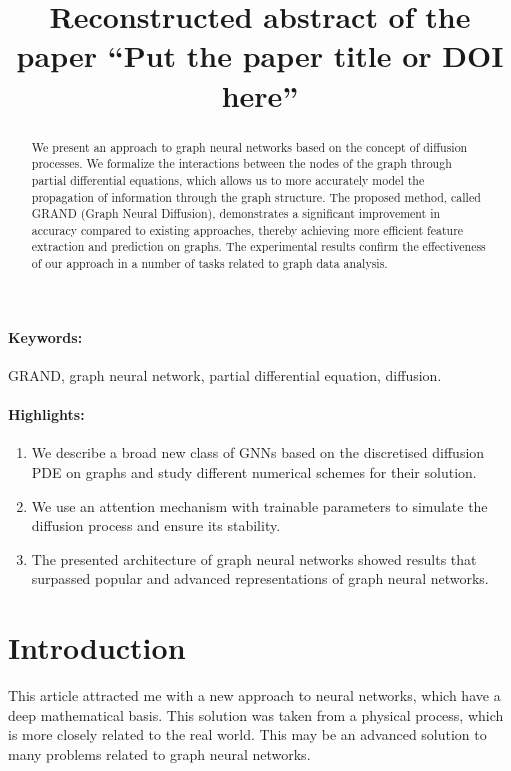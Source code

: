 \documentclass[12pt]{article}
\title{Reconstructed abstract of the paper ``Put the paper title or DOI here''}
\date{}
\begin{document}
\maketitle

\begin{abstract}
We present an approach to graph neural networks based on the concept of diffusion processes. We formalize the interactions between the nodes of the graph through partial differential equations, which allows us to more accurately model the propagation of information through the graph structure. The proposed method, called GRAND (Graph Neural Diffusion), demonstrates a significant improvement in accuracy compared to existing approaches, thereby achieving more efficient feature extraction and prediction on graphs. The experimental results confirm the effectiveness of our approach in a number of tasks related to graph data analysis. 
\end{abstract}
\paragraph{Keywords:} GRAND, graph neural network, partial differential equation, diffusion.

\paragraph{Highlights:}
\begin{enumerate}
\item We describe a broad new class of GNNs based on the discretised diffusion PDE on graphs and study different numerical schemes for their solution.
\item We use an attention mechanism with trainable parameters to simulate the diffusion process and ensure its stability. 
\item The presented architecture of graph neural networks showed results that surpassed popular and advanced representations of graph neural networks. 
\end{enumerate}

\section{Introduction}
This article attracted me with a new approach to neural networks, which have a deep mathematical basis. This solution was taken from a physical process, which is more closely related to the real world. This may be an advanced solution to many problems related to graph neural networks. 



\end{document}

